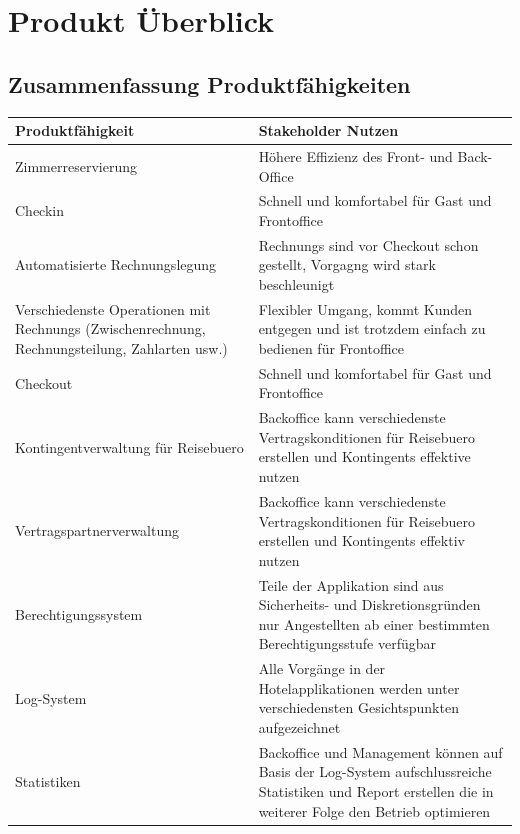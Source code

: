 \documentclass[10pt,a4paper,titlepage]{article}
\begin{document}
\newpage

\section{Produkt Überblick}
\subsection{Zusammenfassung Produktfähigkeiten}
\begin{tabular}{|p{5.7cm}|p{5.7cm}|}
	\hline
	\textbf{Produktfähigkeit} &
	\textbf{Stakeholder Nutzen}
	\\
	\hline
	Zimmerreservierung &
	Höhere Effizienz des Front- und Back-Office
	\\
	\hline
	\Gls{Checkin} &
	Schnell und komfortabel für \Gls{Gast} und \Gls{Frontoffice}
	\\
	\hline
	Automatisierte Rechnungslegung &
	\Glspl{Rechnung} sind vor \Gls{Checkout} schon gestellt, Vorgagng wird stark beschleunigt
	\\
	\hline
	Verschiedenste Operationen mit \Glspl{Rechnung} (\Gls{Zwischenrechnung}, Rechnungsteilung, Zahlarten usw.) &
	Flexibler Umgang, kommt \Gls{Kunde}n entgegen und ist trotzdem einfach zu bedienen für \Gls{Frontoffice}
	\\
	\hline
	\Gls{Checkout} &
	Schnell und komfortabel für Gast und \Gls{Frontoffice}
	\\
	\hline
	Kontingentverwaltung für \Gls{Reisebuero} &
	\Gls{Backoffice} kann verschiedenste Vertragskonditionen für \Gls{Reisebuero} erstellen und \Glspl{Kontingent} effektive nutzen
	\\
	\hline
	Vertragspartnerverwaltung &
	\Gls{Backoffice} kann verschiedenste Vertragskonditionen für \Gls{Reisebuero} erstellen und \Glspl{Kontingent} effektiv nutzen
	\\
	\hline
	Berechtigungssystem &
	Teile der Applikation sind aus Sicherheits- und Diskretionsgründen nur Angestellten ab einer bestimmten Berechtigungsstufe verfügbar
	\\
	\hline
	Log-System &
	Alle Vorgänge in der Hotelapplikationen werden unter verschiedensten Gesichtspunkten aufgezeichnet
	\\
	\hline
	Statistiken &
	\Gls{Backoffice} und Management können auf Basis der Log-System aufschlussreiche Statistiken und Report erstellen die in weiterer Folge den Betrieb optimieren
	\\
	\hline
\end{tabular}

\newpage
\end{document}
